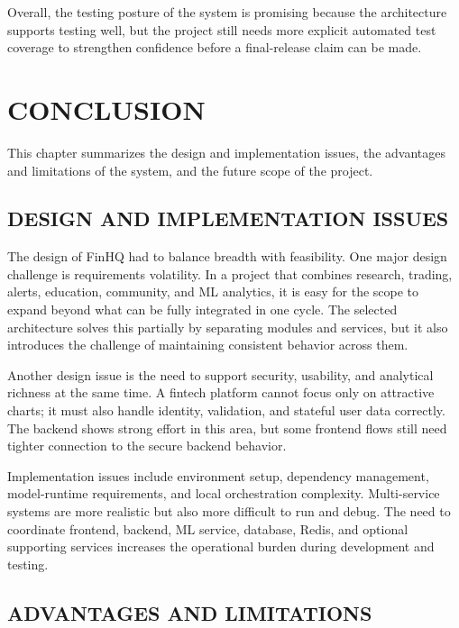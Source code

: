\documentclass[12pt,a4paper]{report}
\newcommand{\projectshort}{FinHQ}
\begin{document}
Overall, the testing posture of the system is promising because the architecture supports testing well, but the project still needs more explicit automated test coverage to strengthen confidence before a final-release claim can be made.

\chapter{CONCLUSION}
This chapter summarizes the design and implementation issues, the advantages and limitations of the system, and the future scope of the project.

\section{DESIGN AND IMPLEMENTATION ISSUES}
The design of \projectshort{} had to balance breadth with feasibility. One major design challenge is requirements volatility. In a project that combines research, trading, alerts, education, community, and ML analytics, it is easy for the scope to expand beyond what can be fully integrated in one cycle. The selected architecture solves this partially by separating modules and services, but it also introduces the challenge of maintaining consistent behavior across them.

Another design issue is the need to support security, usability, and analytical richness at the same time. A fintech platform cannot focus only on attractive charts; it must also handle identity, validation, and stateful user data correctly. The backend shows strong effort in this area, but some frontend flows still need tighter connection to the secure backend behavior.

Implementation issues include environment setup, dependency management, model-runtime requirements, and local orchestration complexity. Multi-service systems are more realistic but also more difficult to run and debug. The need to coordinate frontend, backend, ML service, database, Redis, and optional supporting services increases the operational burden during development and testing.

\section{ADVANTAGES AND LIMITATIONS}
\end{document}
